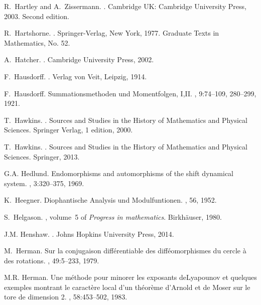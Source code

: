 \documentclass[12pt]{amsart}
\begin{document}
\begin{thebibliography}{100}
R.~Hartley and A.~Zissermann.
.
\newblock Cambridge UK: Cambridge University Press, 2003.
\newblock Second edition.

R.~Hartshorne.
.
\newblock Springer-Verlag, New York, 1977.
\newblock Graduate Texts in Mathematics, No. 52.

A.~Hatcher.
.
\newblock Cambridge University Press, 2002.

F.~Hausdorff.
.
\newblock Verlag von Veit, Leipzig, 1914.

F.~Hausdorff.
\newblock Summationsmethoden und {Momentfolgen}, {I,II}.
, 9:74--109, 280--299, 1921.

T.~Hawkins.
.
\newblock Sources and Studies in the History of Mathematics and Physical
  Sciences. Springer Verlag, 1 edition, 2000.

T.~Hawkins.
.
\newblock Sources and Studies in the History of Mathematics and Physical
  Sciences. Springer, 2013.

G.A. Hedlund.
\newblock Endomorphisms and automorphisms of the shift dynamical system.
, 3:320--375, 1969.

K.~Heegner.
\newblock Diophantische {A}nalysis und {M}odulfuntionen.
, 56, 1952.

S.~Helgason.
, volume~5 of {\em Progress in mathematics}.
\newblock Birk{h\"a}user, 1980.

J.M. Henshaw.
.
\newblock Johns Hopkins University Press, 2014.

M.~Herman.
\newblock Sur la conjugaison {diff\'erentiable des diff\'eomorphismes} du
  cercle {\`a} des rotations.
, 49:5--233, 1979.

M.R. Herman.
\newblock Une m\'ethode pour minorer les exposants de{Lyapounov} et quelques
  exemples montrant le caract\`ere local d'un th\'eor\`eme d'{Arnold et de
  Moser} sur le tore de dimension 2.
, 58:453--502, 1983.


\end{thebibliography}
\end{document}
